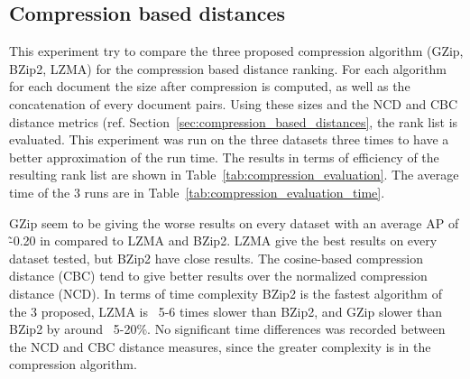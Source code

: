 \subsection{Compression based distances}

This experiment try to compare the three proposed compression algorithm (GZip, BZip2, LZMA) for the compression based distance ranking.
For each algorithm for each document the size after compression is computed, as well as the concatenation of every document pairs.
Using these sizes and the NCD and CBC distance metrics (ref. Section~\ref{sec:compression_based_distances}, the rank list is evaluated.
This experiment was run on the three datasets three times to have a better approximation of the run time.
The results in terms of efficiency of the resulting rank list are shown in Table~\ref{tab:compression_evaluation}.
The average time of the 3 runs are in Table~\ref{tab:compression_evaluation_time}.

GZip seem to be giving the worse results on every dataset with an average AP of \~-0.20 in compared to LZMA and BZip2.
LZMA give the best results on every dataset tested, but BZip2 have close results.
The cosine-based compression distance (CBC) tend to give better results over the normalized compression distance (NCD).
In terms of time complexity BZip2 is the fastest algorithm of the 3 proposed, LZMA is ~5-6 times slower than BZip2, and GZip slower than BZip2 by around ~5-20\%.
No significant time differences was recorded between the NCD and CBC distance measures, since the greater complexity is in the compression algorithm.



